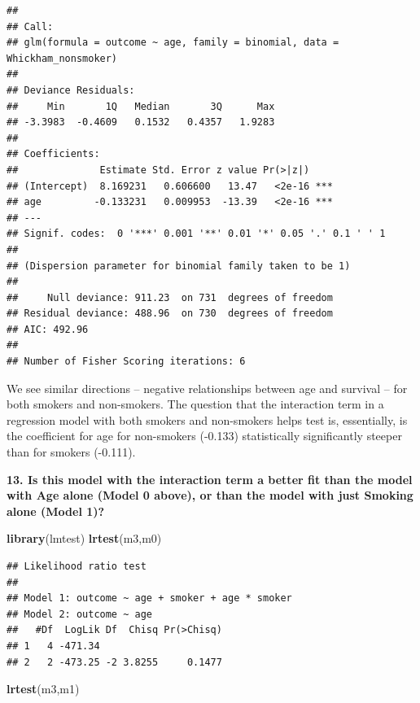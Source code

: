 \documentclass[]{article}
\newenvironment{Shaded}{\begin{snugshade}}{\end{snugshade}}
\newcommand{\KeywordTok}[1]{\textcolor[rgb]{0.13,0.29,0.53}{\textbf{#1}}}
\newcommand{\NormalTok}[1]{#1}
\begin{document}
\begin{verbatim}
## 
## Call:
## glm(formula = outcome ~ age, family = binomial, data = Whickham_nonsmoker)
## 
## Deviance Residuals: 
##     Min       1Q   Median       3Q      Max  
## -3.3983  -0.4609   0.1532   0.4357   1.9283  
## 
## Coefficients:
##              Estimate Std. Error z value Pr(>|z|)    
## (Intercept)  8.169231   0.606600   13.47   <2e-16 ***
## age         -0.133231   0.009953  -13.39   <2e-16 ***
## ---
## Signif. codes:  0 '***' 0.001 '**' 0.01 '*' 0.05 '.' 0.1 ' ' 1
## 
## (Dispersion parameter for binomial family taken to be 1)
## 
##     Null deviance: 911.23  on 731  degrees of freedom
## Residual deviance: 488.96  on 730  degrees of freedom
## AIC: 492.96
## 
## Number of Fisher Scoring iterations: 6
\end{verbatim}

We see similar directions -- negative relationships between age and
survival -- for both smokers and non-smokers. The question that the
interaction term in a regression model with both smokers and non-smokers
helps test is, essentially, is the coefficient for age for non-smokers
(-0.133) statistically significantly steeper than for smokers (-0.111).

\vspace{0.25in}

\textbf{13. Is this model with the interaction term a better fit than
the model with Age alone (Model 0 above), or than the model with just
Smoking alone (Model 1)?}

\begin{Shaded}
\begin{Highlighting}[]
\KeywordTok{library}\NormalTok{(lmtest)}
\KeywordTok{lrtest}\NormalTok{(m3,m0)}
\end{Highlighting}
\end{Shaded}

\begin{verbatim}
## Likelihood ratio test
## 
## Model 1: outcome ~ age + smoker + age * smoker
## Model 2: outcome ~ age
##   #Df  LogLik Df  Chisq Pr(>Chisq)
## 1   4 -471.34                     
## 2   2 -473.25 -2 3.8255     0.1477
\end{verbatim}

\begin{Shaded}
\begin{Highlighting}[]
\KeywordTok{lrtest}\NormalTok{(m3,m1)}
\end{Highlighting}
\end{Shaded}
\end{document}
